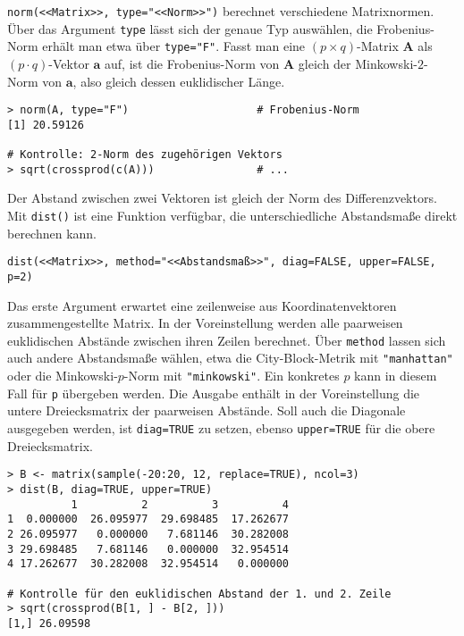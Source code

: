  \lstinline!norm(<<Matrix>>, type="<<Norm>>")! berechnet verschiedene Matrixnormen. Über das Argument \lstinline!type! lässt sich der genaue Typ auswählen, die Frobenius-Norm erhält man etwa über \lstinline!type="F"!. Fasst man eine $(p \times q)$-Matrix $\bm{A}$ als $(p \cdot q)$-Vektor $\bm{a}$ auf, ist die Frobenius-Norm von $\bm{A}$ gleich der Minkowski-$2$-Norm von $\bm{a}$, also gleich dessen euklidischer Länge.
\begin{lstlisting}
> norm(A, type="F")                    # Frobenius-Norm
[1] 20.59126

# Kontrolle: 2-Norm des zugehörigen Vektors
> sqrt(crossprod(c(A)))                # ...
\end{lstlisting}

Der Abstand zwischen zwei Vektoren ist gleich der Norm des Differenzvektors. Mit \lstinline!dist()! ist eine Funktion verfügbar, die unterschiedliche Abstandsmaße direkt berechnen kann.
\begin{lstlisting}
dist(<<Matrix>>, method="<<Abstandsmaß>>", diag=FALSE, upper=FALSE, p=2)
\end{lstlisting}

Das erste Argument erwartet eine zeilenweise aus Koordinatenvektoren zusammengestellte Matrix. In der Voreinstellung werden alle paarweisen euklidischen Abstände zwischen ihren Zeilen berechnet. Über \lstinline!method! lassen sich auch andere Abstandsmaße wählen, etwa die City-Block-Metrik mit \lstinline!"manhattan"! oder die Minkowski-$p$-Norm mit \lstinline!"minkowski"!. Ein konkretes $p$ kann in diesem Fall für \lstinline!p! übergeben werden. Die Ausgabe enthält in der Voreinstellung die untere Dreiecksmatrix der paarweisen Abstände. Soll auch die Diagonale ausgegeben werden, ist \lstinline!diag=TRUE! zu setzen, ebenso \lstinline!upper=TRUE! für die obere Dreiecksmatrix.
\begin{lstlisting}
> B <- matrix(sample(-20:20, 12, replace=TRUE), ncol=3)
> dist(B, diag=TRUE, upper=TRUE)
          1          2          3          4
1  0.000000  26.095977  29.698485  17.262677
2 26.095977   0.000000   7.681146  30.282008
3 29.698485   7.681146   0.000000  32.954514
4 17.262677  30.282008  32.954514   0.000000

# Kontrolle für den euklidischen Abstand der 1. und 2. Zeile
> sqrt(crossprod(B[1, ] - B[2, ]))
[1,] 26.09598
\end{lstlisting}

